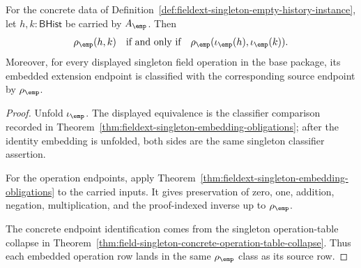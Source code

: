 \begin{theorem}
\label{thm:fieldext-singleton-embedding-exactness}
For the concrete data of
Definition~\ref{def:fieldext-singleton-empty-history-instance}, let
$h,k:\mathsf{BHist}$ be carried by $A_{\emp}$. Then
$$
\rho_{\emp}(h,k)\quad\text{if and only if}\quad
\rho_{\emp}(\iota_{\emp}(h),\iota_{\emp}(k)).
$$
Moreover, for every displayed singleton field operation in the base package, its
embedded extension endpoint is classified with the corresponding source endpoint
by $\rho_{\emp}$.
\end{theorem}
\begin{proof}
Unfold $\iota_{\emp}$. The displayed equivalence is the classifier comparison
recorded in Theorem~\ref{thm:fieldext-singleton-embedding-obligations}; after the
identity embedding is unfolded, both sides are the same singleton classifier
assertion.

For the operation endpoints, apply
Theorem~\ref{thm:fieldext-singleton-embedding-obligations} to the carried inputs. It
gives preservation of zero, one, addition, negation, multiplication, and the
proof-indexed inverse up to $\rho_{\emp}$.

The concrete endpoint identification comes from the singleton operation-table
collapse in Theorem~\ref{thm:field-singleton-concrete-operation-table-collapse}.
Thus each embedded operation row lands in the same $\rho_{\emp}$ class as its
source row.
\end{proof}

